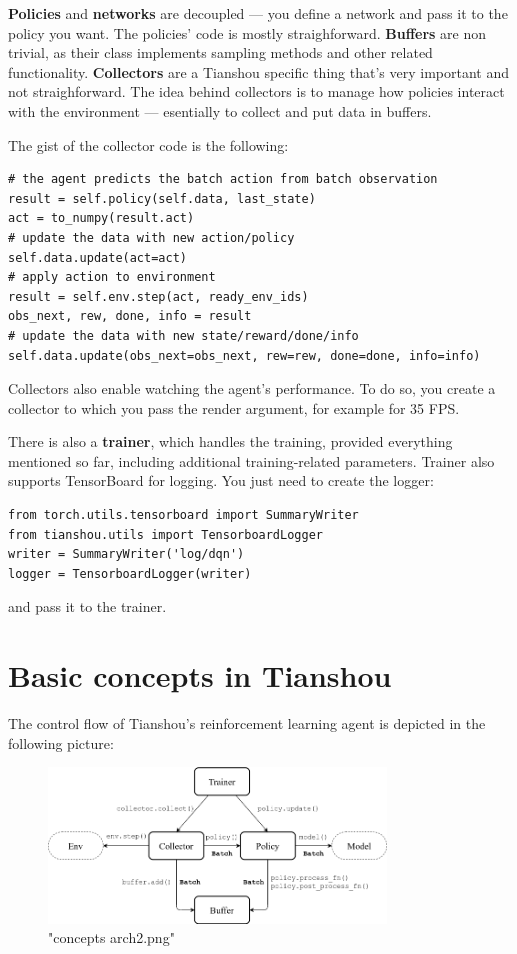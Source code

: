 \documentclass{article}
\begin{document}
\textbf{Policies} and \textbf{networks} are decoupled --- you define a network and pass it to the policy you want.
The policies' code is mostly straighforward.
\textbf{Buffers} are non trivial, as their class implements sampling methods and other related functionality.
\textbf{Collectors} are a Tianshou specific thing that's very important and not straighforward.
The idea behind collectors is to manage how policies interact with the environment ---
esentially to collect and put data in buffers.

The gist of the collector code is the following:
\begin{verbatim}
# the agent predicts the batch action from batch observation
result = self.policy(self.data, last_state)
act = to_numpy(result.act)
# update the data with new action/policy
self.data.update(act=act)
# apply action to environment
result = self.env.step(act, ready_env_ids)
obs_next, rew, done, info = result
# update the data with new state/reward/done/info
self.data.update(obs_next=obs_next, rew=rew, done=done, info=info) 
\end{verbatim}
Collectors also enable watching the agent's performance.
To do so, you create a collector to which you pass the render argument,
for example  for 35 FPS.

There is also a \textbf{trainer}, which handles the training,
provided everything mentioned so far, including additional training-related parameters.
Trainer also supports TensorBoard for logging.
You just need to create the logger:
\begin{verbatim}
from torch.utils.tensorboard import SummaryWriter
from tianshou.utils import TensorboardLogger
writer = SummaryWriter('log/dqn')
logger = TensorboardLogger(writer)
\end{verbatim}
and pass it to the trainer.



\section{Basic concepts in Tianshou}
The control flow of Tianshou's reinforcement learning agent is depicted in the following picture:
\begin{figure}[htpb]
		\centering
		\includegraphics[width=0.8\textwidth]{"./concepts_arch2.png"}
		\caption{"concepts arch2.png"}
\end{figure}
\end{document}
